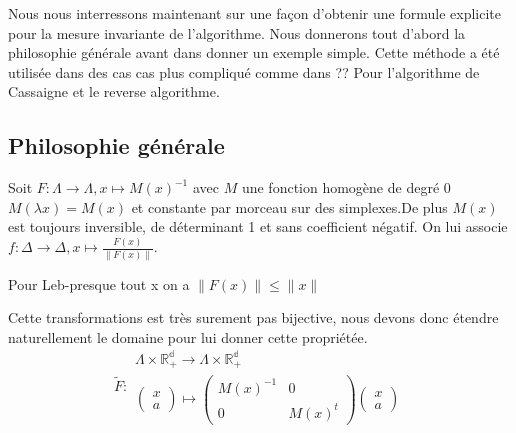 Nous nous interressons maintenant sur une façon d'obtenir une formule explicite pour la mesure invariante de l'algorithme. Nous donnerons tout d'abord la philosophie générale avant dans donner un exemple simple. Cette méthode a été utilisée dans des cas cas plus compliqué comme dans ?? Pour l'algorithme de Cassaigne et le reverse algorithme.

\subsection{Philosophie générale}

Soit $F: \Lambda \to \Lambda,x \mapsto M(x)^{-1}$ avec $M$ une fonction homogène de degré 0 $M(\lambda x)=M(x)$ et constante par morceau sur des simplexes.De plus $M(x)$ est toujours inversible, de déterminant 1 et sans coefficient négatif.\newline
On lui associe $f: \Delta \to \Delta,x \mapsto \frac{F(x)}{\| F(x) \|}$.
\begin{hyp}
Pour Leb-presque tout x on a $\|F(x)\| \leq \|x\|$
\end{hyp}
Cette transformations est très surement pas bijective, nous devons donc étendre naturellement le domaine pour lui donner cette propriétée.
\[
\tilde{F}: \begin{array}{c}
\Lambda \times \mathbb{R_+^d} \to \Lambda \times \mathbb{R_+^d}\\
\begin{pmatrix} x \\ a \end{pmatrix} \mapsto \begin{pmatrix} M(x)^{-1} & 0 \\ 0 & M(x)^t \end{pmatrix} \begin{pmatrix} x \\ a \end{pmatrix}
\end{array}
\]
